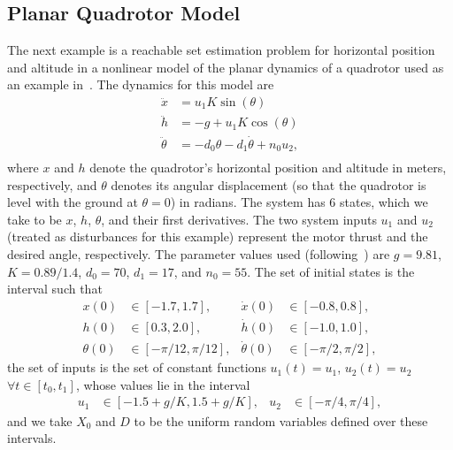 \documentclass[letterpaper, 10 pt, conference]{ieeeconf}
\begin{document}
\subsection{Planar Quadrotor Model}

The next example is a reachable set estimation problem for horizontal position
and altitude in a nonlinear model of the planar dynamics of a quadrotor used as
an example  in~\cite{mitchell2019invariant,bouffard2012board}. 
The dynamics for this model are
\begin{equation}
    \begin{split}
        \ddot{x} &= u_1 K\sin(\theta)\\
        \ddot{h} &= -g + u_1 K\cos(\theta) \\
        \ddot{\theta} &= -d_0\theta - d_1\dot{\theta} + n_0 u_2, \\
    \end{split}
\end{equation}
where $x$ and $h$ denote the quadrotor's horizontal position and altitude in
meters,
respectively, and $\theta$ denotes its angular displacement (so that the
quadrotor is level with the ground at $\theta=0$) in radians. The system has 6
states, which we take to be $x$, $h$, $\theta$, and their first derivatives. The
two system inputs $u_1$ and $u_2$ (treated as disturbances for this example) represent the motor thrust and the desired angle,
respectively. The parameter values used (following~\cite{bouffard2012board}) are $g=9.81$,
$K=0.89/1.4$, $d_0=70$, $d_1=17$, and $n_0=55$. The set of initial states is the interval such that 
\begin{equation*}
    \begin{aligned}
        x(0)&\in[-1.7, 1.7], & \dot{x}(0)&\in[-0.8, 0.8], \\
        h(0)&\in[0.3, 2.0], & \dot{h}(0)&\in[-1.0, 1.0], \\
        \theta(0)&\in[-\pi/12, \pi/12], & \dot{\theta}(0)&\in[-\pi/2, \pi/2],
    \end{aligned}
\end{equation*}
the set of inputs is the set of constant functions $u_1(t)=u_1$, $u_2(t)=u_2$ $\forall t\in[t_0,t_1]$, whose values lie in the
interval
\begin{equation*}
    \begin{aligned}
        u_1&\in[-1.5+ g/K, 1.5 + g/K], & u_2&\in[-\pi/4, \pi/4],
    \end{aligned}
\end{equation*}
and we take $X_0$ and $D$ to be the uniform random variables defined over these intervals.
\end{document}
